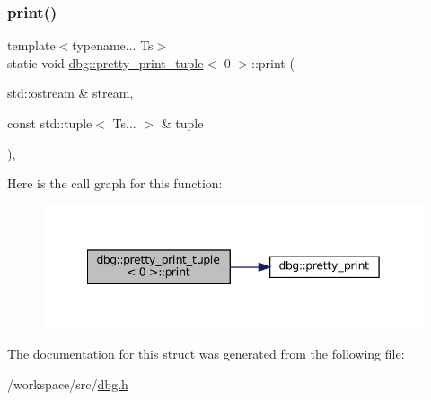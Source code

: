 \subsubsection{\texorpdfstring{print()}{print()}}
{\footnotesize\ttfamily template$<$typename... Ts$>$ \\
static void \hyperlink{structdbg_1_1pretty__print__tuple}{dbg\+::pretty\+\_\+print\+\_\+tuple}$<$ 0 $>$\+::print (\begin{DoxyParamCaption}\item[{std\+::ostream \&}]{stream,  }\item[{const std\+::tuple$<$ Ts... $>$ \&}]{tuple }\end{DoxyParamCaption})\hspace{0.3cm}{\ttfamily [inline]}, {\ttfamily [static]}}

Here is the call graph for this function\+:
\nopagebreak
\begin{figure}[H]
\begin{center}
\leavevmode
\includegraphics[width=342pt]{structdbg_1_1pretty__print__tuple_3_010_01_4_a9961147d35a3bcc6b89af9610c68ad39_cgraph}
\end{center}
\end{figure}


The documentation for this struct was generated from the following file\+:\begin{DoxyCompactItemize}
\item 
/workspace/src/\hyperlink{dbg_8h}{dbg.\+h}\end{DoxyCompactItemize}
